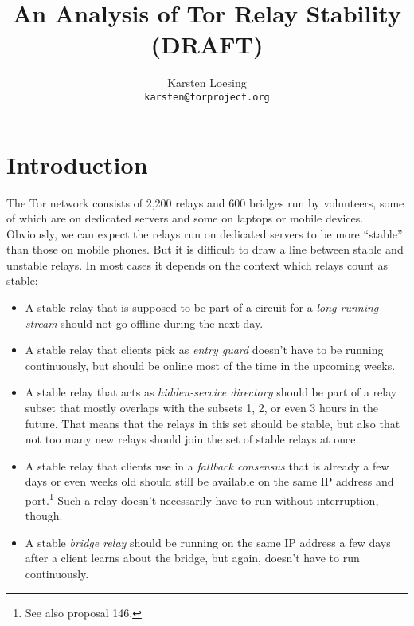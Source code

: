 \documentclass{article}
\begin{document}
\title{An Analysis of Tor Relay Stability\\(DRAFT)}
\author{Karsten Loesing\\{\tt karsten@torproject.org}}

\maketitle

\section{Introduction}

The Tor network consists of 2,200 relays and 600 bridges run by
volunteers, some of which are on dedicated servers and some on laptops or
mobile devices.
Obviously, we can expect the relays run on dedicated servers to be more
``stable'' than those on mobile phones.
But it is difficult to draw a line between stable and unstable relays.
In most cases it depends on the context which relays count as stable:

\begin{itemize}
\item A stable relay that is supposed to be part of a circuit for a
\emph{long-running stream} should not go offline during the next day.
\item A stable relay that clients pick as \emph{entry guard} doesn't have
to be running continuously, but should be online most of the time in the
upcoming weeks.
\item A stable relay that acts as \emph{hidden-service directory} should
be part of a relay subset that mostly overlaps with the subsets 1, 2, or
even 3 hours in the future.
That means that the relays in this set should be stable, but also that not
too many new relays should join the set of stable relays at once.
\item A stable relay that clients use in a \emph{fallback consensus} that
is already a few days or even weeks old should still be available on the
same IP address and port.\footnote{See also proposal 146.}
Such a relay doesn't necessarily have to run without interruption, though.
\item A stable \emph{bridge relay} should be running on the same IP
address a few days after a client learns about the bridge, but again,
doesn't have to run continuously.
\end{itemize}
\end{document}
